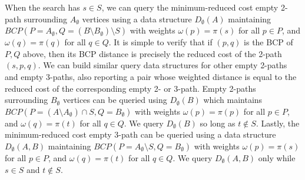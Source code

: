 \documentclass[11pt]{article}
\theoremstyle{plain}
\begin{document}
When the search has $s \in S$, we can query the minimum-reduced cost empty 
2-path surrounding $A_\emptyset$ vertices using a data structure 
$D_\emptyset(A)$ maintaining 
$BCP(P = A_\emptyset, Q = (B \setminus B_\emptyset) \setminus S)$ with weights 
$\omega(p) = \pi(s)$ for all $p \in P$, and $\omega(q) = \pi(q)$ for all 
$q \in Q$.
It is simple to verify that if $(p, q)$ is the BCP of $P, Q$ above, then its
BCP distance is precisely the reduced cost of the 2-path $(s, p, q)$.
We can build similar query data structures for other empty 2-paths and empty 
3-paths, also reporting a pair whose weighted distance is equal to the reduced
cost of the corresponding empty 2- or 3-path.
Empty 2-paths surrounding $B_\emptyset$ vertices can be queried using 
$D_\emptyset(B)$ which maintains 
$BCP(P = (A \setminus A_\emptyset) \cap S, Q = B_\emptyset)$ with weights 
$\omega(p) = \pi(p)$ for all $p \in P$, and $\omega(q) = \pi(t)$ for all 
$q \in Q$.
We query $D_\emptyset(B)$ so long as $t \not\in S$.
Lastly, the minimum-reduced cost empty 3-path can be queried using a data 
structure $D_\emptyset(A, B)$ maintaining 
$BCP(P = A_\emptyset \setminus S, Q = B_\emptyset)$ with weights 
$\omega(p) = \pi(s)$ for all $p \in P$, and $\omega(q) = \pi(t)$ for all 
$q \in Q$.
We query $D_\emptyset(A, B)$ only while $s \in S$ and $t \not\in S$.




\end{document}
